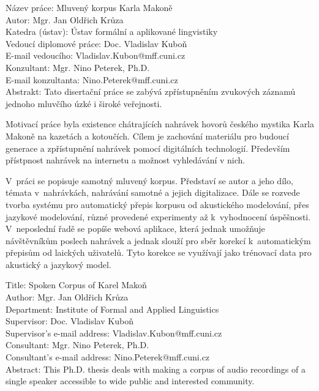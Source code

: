 \noindent Název práce: Mluven\'{y} korpus Karla Makon\v{e}\\
Autor: Mgr. Jan Oldřich Krůza\\
Katedra (ústav): Ústav formální a aplikované lingvistiky\\
Vedoucí diplomové práce: Doc. Vladislav Kuboň\\
E-mail vedoucího: Vladislav.Kubon@mff.cuni.cz\\
Konzultant: Mgr. Nino Peterek, Ph.D.\\
E-mail konzultanta: Nino.Peterek@mff.cuni.cz\\

\noindent Abstrakt: Tato disertační práce se zabývá zpřístupněním zvukových
záznamů jednoho mluvčího úzké i široké veřejnosti.

Motivací práce byla existence chátrajících nahrávek hovorů českého mystika
Karla Makoně na kazetách a kotoučích. Cílem je zachování materiálu pro
budoucí generace a zpřístupnění nahrávek pomocí digitálních technologií.
Především přístpnost nahrávek na internetu a možnost vyhledávání v nich.

V~práci se popisuje samotný mluvený korpus. Představí se autor a
jeho dílo,
témata v~nahrávkách, nahrávání samotné a jejich digitalizace. Dále se rozvede tvorba systému pro automatický
přepis korpusu od akustického modelování, přes jazykové modelování, různé
provedené experimenty až k~vyhodnocení úspěšnosti. V~neposlední řadě se popíše
webová aplikace, která jednak umožňuje návštěvníkům
poslech nahrávek a jednak slouží pro sběr korekcí k~automatickým přepisům od
laických uživatelů. Tyto korekce se využívají jako trénovací
data pro akustický a jazykový model.

\vspace{10mm}

\noindent
Title: Spoken Corpus of Karel Makoň\\
Author: Mgr. Jan Oldřich Krůza\\
Department: Institute of Formal and Applied Linguistics\\
Supervisor: Doc. Vladislav Kuboň\\
Supervisor's e-mail address: Vladislav.Kubon@mff.cuni.cz\\
Consultant: Mgr. Nino Peterek, Ph.D.\\
Consultant's e-mail address: Nino.Peterek@mff.cuni.cz\\

\noindent Abstract:  This Ph.D. thesis deals with making a corpus of audio
recordings of a single speaker accessible to wide public and interested community.

